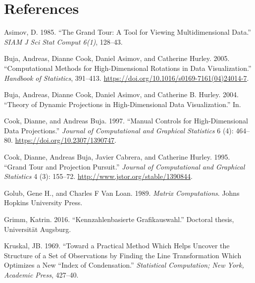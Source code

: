 \hypertarget{references}{%
\section*{References}\label{references}}

\hypertarget{refs}{}
\begin{CSLReferences}{1}{0}
\leavevmode{}%
Asimov, D. 1985. {``The Grand Tour: A Tool for Viewing Multidimensional Data.''} \emph{SIAM J Sci Stat Comput 6(1)}, 128--43.

\leavevmode{}%
Buja, Andreas, Dianne Cook, Daniel Asimov, and Catherine Hurley. 2005. {``Computational Methods for High-Dimensional Rotations in Data Visualization.''} \emph{Handbook of Statistics}, 391--413. \url{https://doi.org/10.1016/s0169-7161(04)24014-7}.

\leavevmode{}%
Buja, Andreas, Dianne Cook, Daniel Asimov, and Catherine B. Hurley. 2004. {``Theory of Dynamic Projections in High-Dimensional Data Visualization.''} In.

\leavevmode{}%
Cook, Dianne, and Andreas Buja. 1997. {``Manual Controls for High-Dimensional Data Projections.''} \emph{Journal of Computational and Graphical Statistics} 6 (4): 464--80. \url{https://doi.org/10.2307/1390747}.

\leavevmode{}%
Cook, Dianne, Andreas Buja, Javier Cabrera, and Catherine Hurley. 1995. {``Grand Tour and Projection Pursuit.''} \emph{Journal of Computational and Graphical Statistics} 4 (3): 155--72. \url{http://www.jstor.org/stable/1390844}.

\leavevmode{}%
Golub, Gene H., and Charles F Van Loan. 1989. \emph{Matrix Computations}. Johns Hopkins University Press.

\leavevmode{}%
Grimm, Katrin. 2016. {``Kennzahlenbasierte Grafikauswahl.''} Doctoral thesis, Universit{ä}t Augsburg.

\leavevmode{}%
Kruskal, JB. 1969. {``Toward a Practical Method Which Helps Uncover the Structure of a Set of Observations by Finding the Line Transformation Which Optimizes a New ``Index of Condensation.''} \emph{Statistical Computation; New York, Academic Press}, 427--40.


\end{CSLReferences}
